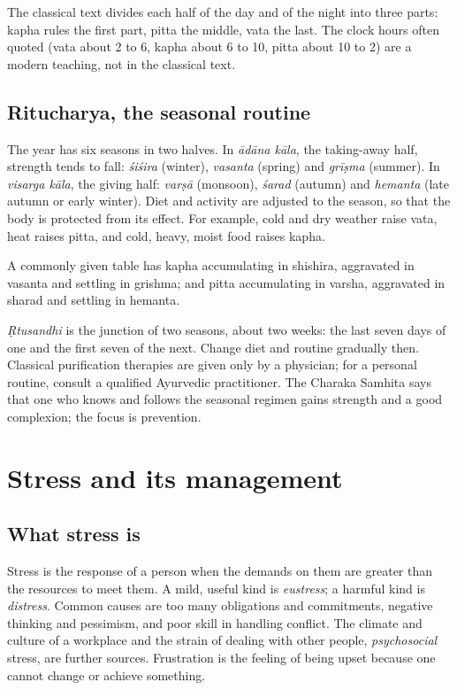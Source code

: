 The classical text divides each half of the day and of the night into three parts: kapha rules the first part, pitta the middle, vata the last. The clock hours often quoted (vata about 2 to 6, kapha about 6 to 10, pitta about 10 to 2) are a modern teaching, not in the classical text.

\subsection*{Ritucharya, the seasonal routine}
The year has six seasons in two halves. In \emph{ādāna kāla}, the taking-away half, strength tends to fall: \emph{śiśira} (winter), \emph{vasanta} (spring) and \emph{grīṣma} (summer). In \emph{visarga kāla}, the giving half: \emph{varṣā} (monsoon), \emph{śarad} (autumn) and \emph{hemanta} (late autumn or early winter). Diet and activity are adjusted to the season, so that the body is protected from its effect. For example, cold and dry weather raise vata, heat raises pitta, and cold, heavy, moist food raises kapha.

A commonly given table has kapha accumulating in shishira, aggravated in vasanta and settling in grishma; and pitta accumulating in varsha, aggravated in sharad and settling in hemanta.

\emph{Ṛtusandhi} is the junction of two seasons, about two weeks: the last seven days of one and the first seven of the next. Change diet and routine gradually then. Classical purification therapies are given only by a physician; for a personal routine, consult a qualified Ayurvedic practitioner. The Charaka Samhita says that one who knows and follows the seasonal regimen gains strength and a good complexion; the focus is prevention.

\section{Stress and its management}

\subsection*{What stress is}
Stress is the response of a person when the demands on them are greater than the resources to meet them. A mild, useful kind is \emph{eustress}; a harmful kind is \emph{distress}. Common causes are too many obligations and commitments, negative thinking and pessimism, and poor skill in handling conflict. The climate and culture of a workplace and the strain of dealing with other people, \emph{psychosocial} stress, are further sources. Frustration is the feeling of being upset because one cannot change or achieve something.

